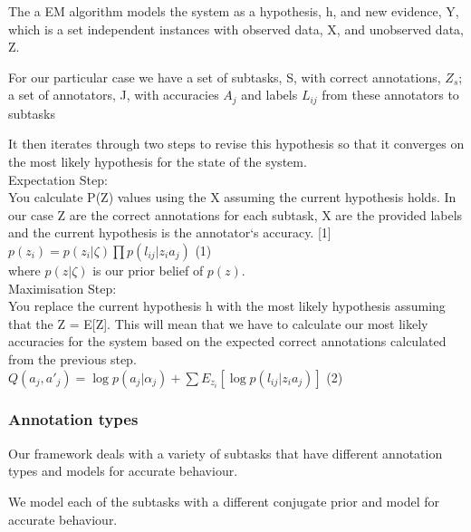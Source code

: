 \documentclass[11pt]{article}
\begin{document}
The a EM algorithm models the system as a hypothesis, h, and new evidence, Y, which is a set independent instances with observed data, X, and unobserved data, Z.

For our particular case we have a set of subtasks, S, with correct annotations, $Z_{s}$; a set of annotators, J, with accuracies $A_{j}$ and labels $L_{ij}$ from these annotators to subtasks

It then iterates through two steps to revise this hypothesis so that it converges on the most likely hypothesis for the state of the system.\\

Expectation Step:\\
You calculate P(Z) values using the X assuming the current hypothesis holds. In our case Z are the correct annotations for each subtask, X are the provided labels and the current hypothesis is the annotator`s accuracy. [1]\\

$ p(z_{i}) = p(z_{i}|\zeta) \prod p (l_{ij} | z_{i} a_{j}) $ (1)\\

where $p(z|\zeta)$ is our prior belief of $p(z)$.\\

Maximisation Step:\\
You replace the current hypothesis h with the most likely hypothesis assuming that the Z = E[Z]. This will mean that we have to calculate our most likely accuracies for the system based on the expected correct annotations calculated from the previous step.\\

$ Q(a_{j},a\prime_{j}) = \log p(a_{j}|\alpha_{j}) + \sum E_{z_{i}} [\log p (l_{ij} | z_{i} a_{j})]$ (2)\\

\subsubsection{Annotation types}

Our framework deals with a variety of subtasks that have different annotation types and models for accurate behaviour.

We model each of the subtasks with a different conjugate prior and model for accurate behaviour.\\
\end{document}
